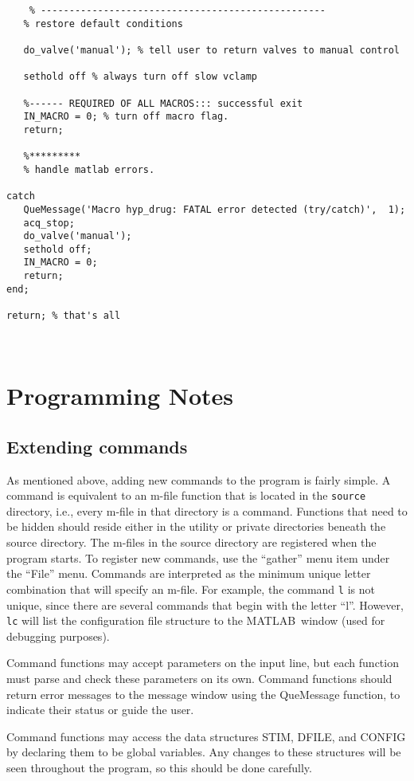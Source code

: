 \documentclass[11pt, letterpaper, titlepage]{paper}
\newcommand{\ml}{\textsf{MATLAB}}
\begin{document}
\begin{verbatim}
    % --------------------------------------------------
   % restore default conditions
   
   do_valve('manual'); % tell user to return valves to manual control
   
   sethold off % always turn off slow vclamp
   
   %------ REQUIRED OF ALL MACROS::: successful exit
   IN_MACRO = 0; % turn off macro flag.
   return;
   
   %*********
   % handle matlab errors.
   
catch
   QueMessage('Macro hyp_drug: FATAL error detected (try/catch)',  1);
   acq_stop;
   do_valve('manual');
   sethold off;
   IN_MACRO = 0;
   return;
end;

return; % that's all



\end{verbatim}


\section{Programming Notes}
\subsection{Extending commands} As mentioned above, adding new commands to the 
program is fairly simple. A command is equivalent to an m-file 
function that is located in the \texttt{source} directory, i.e., 
every m-file in that directory is a command. Functions that need 
to be hidden should reside either in the utility or private 
directories beneath the source directory. The m-files in the 
source directory are registered when the program starts. To 
register new commands, use the ``gather'' menu item under the 
``File'' menu. Commands are interpreted as the minimum unique 
letter combination that will specify an m-file. For example, the 
command \texttt{l} is not unique, since there are several commands 
that begin with the letter ``l''. However, \texttt{lc} will list 
the configuration file structure to the \ml\ window (used for 
debugging purposes).

Command functions may accept parameters on the input line, but each function must parse 
and check these parameters on its own. Command functions should return error messages to 
the message window using the QueMessage function, to indicate their status or guide the 
user.

Command functions may access the data structures STIM, DFILE, and CONFIG by declaring 
them to be global variables. Any changes to these structures will be seen throughout the 
program, so this should be done carefully.
\end{document}
